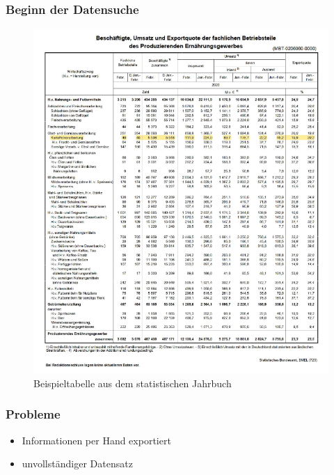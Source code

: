 \documentclass{beamer}
\begin{document}
\begin{frame}
	\frametitle{Beginn der Datensuche}
	\begin{figure}[h]
	\caption{Beispieltabelle aus dem statistischen Jahrbuch}
	\centering
	\includegraphics[scale=0.5]{3_Beispieltabelle}
	\end{figure}
\end{frame}

\begin{frame}
	\frametitle{Probleme}
	\begin{itemize}
		\item Informationen per Hand exportiert
		\item unvollständiger Datensatz
	\end{itemize}
\end{frame}
\end{document}
